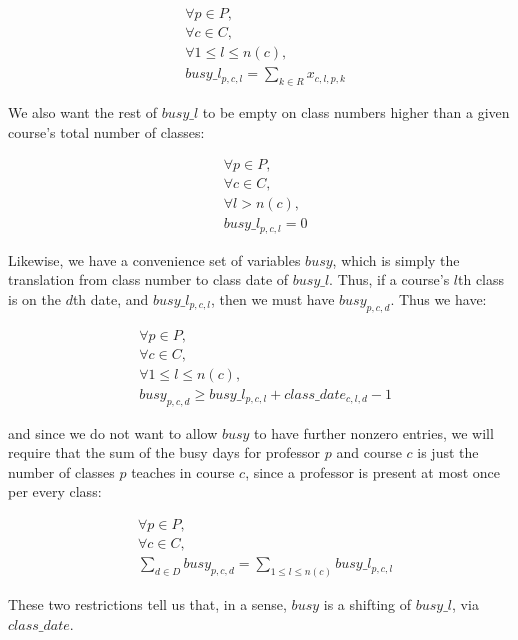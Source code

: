 \begin{align*}
  &\forall p \in P,\\
  &\forall c \in C,\\
  &\forall 1\le l \le n(c),\\
  &busy\_l_{p, c, l} = \sum_{k \in R} x_{c, l, p, k}
\end{align*}

We also want the rest of $busy\_l$ to be empty on class numbers higher than a given course's total number of classes:

\begin{align*}
  &\forall p \in P,\\
  &\forall c \in C,\\
  &\forall l > n(c),\\
  &busy\_l_{p, c, l} = 0
\end{align*}

Likewise, we have a convenience set of variables $busy$, which is simply the translation from class number to class date of $busy\_l$. Thus, if a course's $l$th class is on the $d$th date, and $busy\_l_{p, c, l}$, then we must have $busy_{p, c, d}$. Thus we have:

\begin{align*}
  &\forall p \in P,\\
  &\forall c \in C,\\
  &\forall 1 \le l \le n(c),\\
  &busy_{p, c, d} \ge busy\_l_{p, c, l} + class\_date_{c, l, d} - 1
\end{align*}

and since we do not want to allow $busy$ to have further nonzero entries, we will require that the sum of the busy days for professor $p$ and course $c$ is just the number of classes $p$ teaches in course $c$, since a professor is present at most once per every class:

\begin{align*}
  &\forall p \in P,\\
  &\forall c \in C,\\
  &\sum_{d \in D} busy_{p, c, d} = \sum_{1 \le l \le n(c)} busy\_l_{p, c, l}
\end{align*}

These two restrictions tell us that, in a sense, $busy$ is a shifting of $busy\_l$, via $class\_date$.
